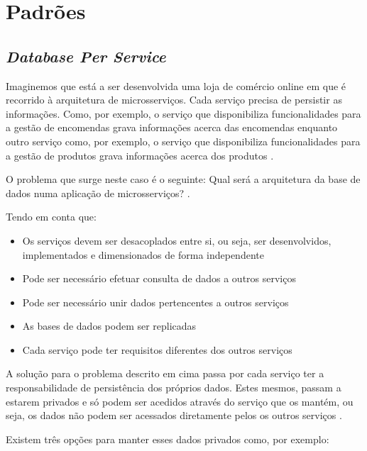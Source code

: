 \section{Padrões}
\subsection{\textit{Database Per Service}}

Imaginemos que está a ser desenvolvida uma loja de comércio online em que é recorrido à arquitetura de microsserviços. Cada serviço precisa de persistir as informações. Como, por exemplo, o serviço que disponibiliza funcionalidades para a gestão de encomendas grava informações acerca das encomendas enquanto outro serviço como, por exemplo, o serviço que disponibiliza funcionalidades para a gestão de produtos grava informações acerca dos produtos \cite{databasePerServicePattern}.

O problema que surge neste caso é o seguinte: Qual será a arquitetura da base de dados numa aplicação de microsserviços? \cite{databasePerServicePattern}.

Tendo em conta que:

\begin{itemize}
    \item Os serviços devem ser desacoplados entre si, ou seja, ser desenvolvidos, implementados e dimensionados de forma independente \cite{databasePerServicePattern}
    \item Pode ser necessário efetuar consulta de dados a outros serviços \cite{databasePerServicePattern}
    \item Pode ser necessário unir dados pertencentes a outros serviços \cite{databasePerServicePattern}
    \item As bases de dados podem ser replicadas \cite{databasePerServicePattern}
    \item Cada serviço pode ter requisitos diferentes dos outros serviços \cite{databasePerServicePattern}
\end{itemize}

A solução para o problema descrito em cima passa por cada serviço ter a responsabilidade de persistência dos próprios dados. Estes mesmos, passam a estarem privados e só podem ser acedidos através do serviço que os mantém, ou seja, os dados não podem ser acessados diretamente pelos os outros serviços \cite{databasePerServicePattern}.

Existem três opções para manter esses dados privados como, por exemplo:

